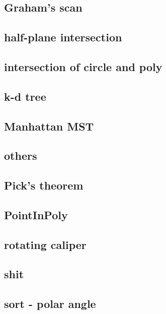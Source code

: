 \documentclass[a4paper,5pt,twocolumn,titlepage]{article}
\begin{document}
\subsection{Graham's scan}

\subsection{half-plane intersection}

\subsection{intersection of circle and poly}

\subsection{k-d tree}

\subsection{Manhattan MST}

\subsection{others}

\subsection{Pick's theorem}

\subsection{PointInPoly}

\subsection{rotating caliper}

\subsection{shit}

\subsection{sort - polar angle}

\end{document}
